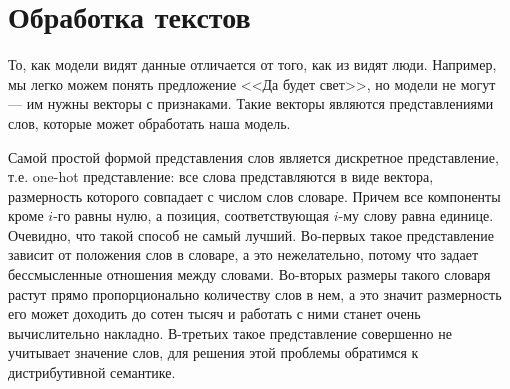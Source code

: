 %


































\section{Обработка текстов}
\label{section:textRepsesentation}

То, как модели видят данные отличается от того, как из видят люди. Например, мы легко можем понять предложение <<Да будет свет>>, но модели не могут --- им нужны векторы с признаками. Такие векторы являются представлениями слов, которые может обработать наша модель.

\bigskip
Самой простой формой представления слов является дискретное представление, т.е. one-hot представление: все слова представляются в виде вектора, размерность которого совпадает с числом слов словаре. Причем все компоненты кроме $i$-го равны нулю, а позиция, соответствующая $i$-му слову равна единице. Очевидно, что такой способ не самый лучший. Во-первых такое представление зависит от положения слов в словаре, а это нежелательно, потому что задает бессмысленные отношения между словами. Во-вторых размеры такого словаря растут прямо пропорционально количеству слов в нем, а это значит размерность его может доходить до сотен тысяч и работать с ними станет очень вычислительно накладно. В-третьих такое представление совершенно не учитывает значение слов, для решения этой проблемы обратимся к дистрибутивной семантике.

